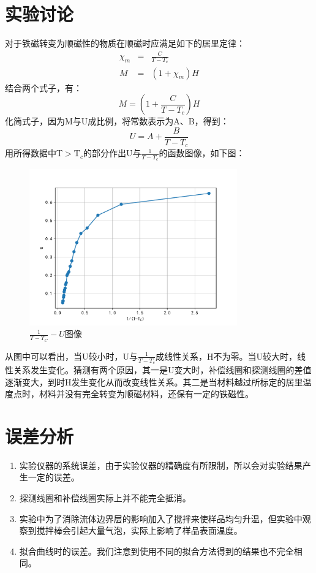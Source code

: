 \documentclass[a4paper]{article}
\begin{document}
\section{实验讨论}
对于铁磁转变为顺磁性的物质在顺磁时应满足如下的居里定律：
\begin{eqnarray*}
    \chi_m &=& \frac{C}{T-T_c}\\
    M &=& (1+\chi_m)H
\end{eqnarray*}
结合两个式子，有：
\begin{equation*}
    M = \left(1+\frac{C}{T-T_c}\right)H
\end{equation*}
化简式子，因为M与U成比例，将常数表示为A、B，得到：
\begin{equation*}
    U = A + \frac{B}{T-T_c}
\end{equation*}
用所得数据中T$>\text{T}_c$的部分作出U与$\frac{1}{T-T_c}$的函数图像，如下图：
\begin{figure}[!h]
\centering
\includegraphics[width=0.8\textwidth]{fig/discussion.pdf}
\caption{$\frac{1}{T-T_C} - U$图像}\label{discussion}
\end{figure}

从图中可以看出，当U较小时，U与$\frac{1}{T-T_c}$成线性关系，H不为零。当U较大时，线性关系发生变化。猜测有两个原因，其一是U变大时，补偿线圈和探测线圈的差值逐渐变大，到时H发生变化从而改变线性关系。其二是当材料越过所标定的居里温度点时，材料并没有完全转变为顺磁材料，还保有一定的铁磁性。

\section{误差分析}
\begin{enumerate}
    \item 实验仪器的系统误差，由于实验仪器的精确度有所限制，所以会对实验结果产生一定的误差。
    \item 探测线圈和补偿线圈实际上并不能完全抵消。
    \item 实验中为了消除流体边界层的影响加入了搅拌来使样品均匀升温，但实验中观察到搅拌棒会引起大量气泡，实际上影响了样品表面温度。
    \item 拟合曲线时的误差。我们注意到使用不同的拟合方法得到的结果也不完全相同。
\end{enumerate}
\end{document}
